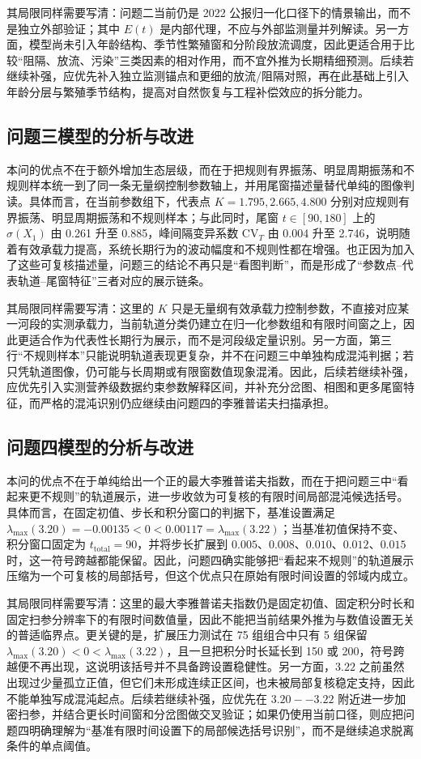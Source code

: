 \documentclass{MMCStyle}
\begin{document}
其局限同样需要写清：问题二当前仍是 2022 公报归一化口径下的情景输出，而不是独立外部验证；其中 $E(t)$ 是内部代理，不应与外部监测量并列解读。另一方面，模型尚未引入年龄结构、季节性繁殖窗和分阶段放流调度，因此更适合用于比较“阻隔、放流、污染”三类因素的相对作用，而不宜外推为长期精细预测。后续若继续补强，应优先补入独立监测锚点和更细的放流/阻隔对照，再在此基础上引入年龄分层与繁殖季节结构，提高对自然恢复与工程补偿效应的拆分能力。

\subsection{问题三模型的分析与改进}
本问的优点不在于额外增加生态层级，而在于把规则有界振荡、明显周期振荡和不规则样本统一到了同一条无量纲控制参数轴上，并用尾窗描述量替代单纯的图像判读。具体而言，在当前参数组下，代表点 $K=1.795,2.665,4.800$ 分别对应规则有界振荡、明显周期振荡和不规则样本；与此同时，尾窗 $t\in[90,180]$ 上的 $\sigma(X_1)$ 由 0.261 升至 0.885，峰间隔变异系数 $\mathrm{CV}_T$ 由 0.004 升至 2.746，说明随着有效承载力提高，系统长期行为的波动幅度和不规则性都在增强。也正因为加入了这些可复核描述量，问题三的结论不再只是“看图判断”，而是形成了“参数点--代表轨道--尾窗特征”三者对应的展示链条。

其局限同样需要写清：这里的 $K$ 只是无量纲有效承载力控制参数，不直接对应某一河段的实测承载力，当前轨道分类仍建立在归一化参数组和有限时间窗之上，因此更适合作为代表性长期行为展示，而不是河段级定量识别。另一方面，第三行“不规则样本”只能说明轨道表现更复杂，并不在问题三中单独构成混沌判据；若只凭轨道图像，仍可能与长周期或有限窗数值现象混淆。因此，后续若继续补强，应优先引入实测营养级数据约束参数解释区间，并补充分岔图、相图和更多尾窗特征，而严格的混沌识别仍应继续由问题四的李雅普诺夫扫描承担。

\subsection{问题四模型的分析与改进}
本问的优点不在于单纯给出一个正的最大李雅普诺夫指数，而在于把问题三中“看起来更不规则”的轨道展示，进一步收敛为可复核的有限时间局部混沌候选括号。具体而言，在固定初值、步长和积分窗口的判据下，基准设置满足 $\lambda_{\max}(3.20)=-0.00135<0<0.00117=\lambda_{\max}(3.22)$；当基准初值保持不变、积分窗口固定为 $t_{\text{total}}=90$，并将步长扩展到 $0.005$、$0.008$、$0.010$、$0.012$、$0.015$ 时，这一符号跨越都能保留。因此，问题四确实能够把“看起来不规则”的轨道展示压缩为一个可复核的局部括号，但这个优点只在原始有限时间设置的邻域内成立。

其局限同样需要写清：这里的最大李雅普诺夫指数仍是固定初值、固定积分时长和固定扫参分辨率下的有限时间数值量，因此不能把当前结果外推为与数值设置无关的普适临界点。更关键的是，扩展压力测试在 75 组组合中只有 5 组保留 $\lambda_{\max}(3.20)<0<\lambda_{\max}(3.22)$，且一旦把积分时长延长到 150 或 200，符号跨越便不再出现，这说明该括号并不具备跨设置稳健性。另一方面，$3.22$ 之前虽然出现过少量孤立正值，但它们未形成连续正区间，也未被局部复核稳定支持，因此不能单独写成混沌起点。后续若继续补强，应优先在 $3.20--3.22$ 附近进一步加密扫参，并结合更长时间窗和分岔图做交叉验证；如果仍使用当前口径，则应把问题四明确理解为“基准有限时间设置下的局部候选括号识别”，而不是继续追求脱离条件的单点阈值。
\end{document}
